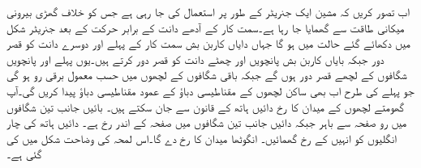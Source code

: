 اب  تصور کریں کہ مشین ایک جنریٹر کے طور پر استعمال کی جا رہی ہے جس کو خلاف  گھڑی  بیرونی میکانی طاقت سے گھمایا جا رہا ہے۔سمت کار کے آدھے دانت کے برابر حرکت  کے بعد جنریٹر  شکل  میں دکھائے گئے حالت میں ہو گا جہاں  دایاں کاربن بش سمت کار کے پہلے اور دوسرے دانت کو قصر دور جبکہ بایاں کاربن بش  پانچویں اور چھٹے دانت کو قصر دور کرتے ہیں۔یوں پہلے اور پانچویں شگافوں کے لچھے قصر دور ہوں گے جبکہ باقی شگافوں کے لچھوں میں حسب معمول برقی رو ہو  گی جو پہلے کی طرح اب بھی ساکن لچھوں کے مقناطیسی دباؤ کے عمود  مقناطیسی دباؤ پیدا کریں گی۔آپ گھومتے لچھوں کے میدان کا رخ دائیں ہاتھ کے قانون سے جان سکتے ہیں۔ بائیں جانب تین شگافوں میں رو صفحہ سے باہر جبکہ دائیں جانب تین شگافوں میں صفحہ کے اندر رخ ہے۔ دائیں ہاتھ کی چار انگلیوں کو انہیں کے رخ گھمائیں۔ انگوٹھا میدان کا  رخ  دے گا۔اس لمحہ کی وضاحت شکل   میں کی گئی ہے۔

